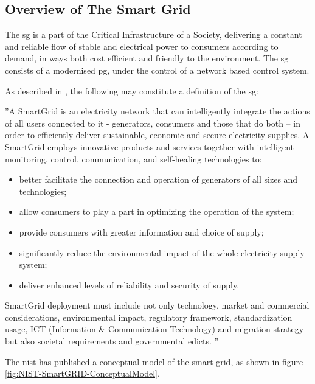\subsection{Overview of The Smart Grid}
The \acrshort{sg} is a part of the Critical Infrastructure of a Society, delivering a constant and reliable flow of stable and electrical power to consumers according to demand, in ways both cost efficient and friendly to the environment. The \acrshort{sg} consists of a modernised \acrshort{pg}, under the control of a network based control system. 


As described in \cite{smartgrids2012smartgrids}, the following may constitute a definition of the \acrlong{sg}:

\begin{displayquote}
''A SmartGrid is an electricity network that can intelligently integrate the actions of all
users connected to it - generators, consumers and those that do both – in order to
efficiently deliver sustainable, economic and secure electricity supplies.
A SmartGrid employs innovative products and services together with intelligent monitoring,
control, communication, and self-healing technologies to:
\begin{itemize}
\item better facilitate the connection and operation of generators of all sizes and technologies;
\item allow consumers to play a part in optimizing the operation of the system;
\item provide consumers with greater information and choice of supply;
\item significantly reduce the environmental impact of the whole electricity supply system;
\item deliver enhanced levels of reliability and security of supply.
\end{itemize}
SmartGrid deployment must include not only technology, market and commercial
considerations, environmental impact, regulatory framework, standardization usage, ICT
(Information \& Communication Technology) and migration strategy but also societal
requirements and governmental edicts. 
'' 
\end{displayquote}

The \acrfull{nist} has published a conceptual model of the smart grid, as shown in 
figure \ref{fig:NIST-SmartGRID-ConceptualModel}.



